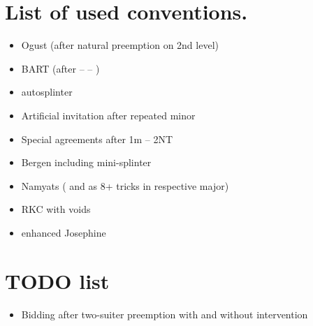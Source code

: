 \documentclass{article}
\begin{document}
  \section{List of used conventions.}
  \begin{itemize}
    \item Ogust (after natural preemption on 2nd level)
    \item BART (after  --  -- )
    \item autosplinter
    \item Artificial invitation after repeated minor
    \item Special agreements after 1m -- 2NT
    \item Bergen including mini-splinter
    \item Namyats ( and  as 8+ tricks in respective major)
    \item RKC with voids
    \item enhanced Josephine 
  \end{itemize}

  \section{TODO list}
  \begin{itemize}
    \item Bidding after two-suiter preemption with and without intervention
  \end{itemize}
\end{document}
